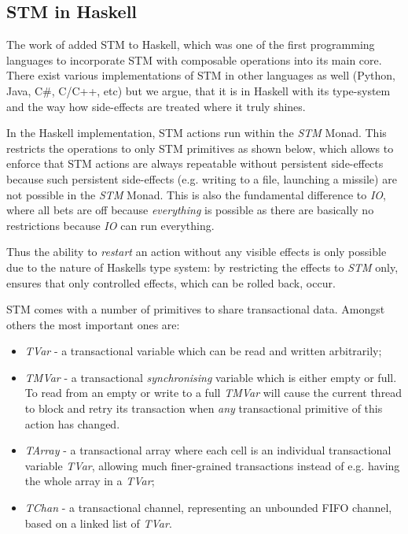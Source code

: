 \subsection{STM in Haskell}
The work of \cite{harris_composable_2005, harris_transactional_2006} added STM to Haskell, which was one of the first programming languages to incorporate STM with composable operations into its main core. There exist various implementations of STM in other languages as well (Python, Java, C\#, C/C++, etc) but we argue, that it is in Haskell with its type-system and the way how side-effects are treated where it truly shines.

In the Haskell implementation, STM actions run within the \textit{STM} Monad. This restricts the operations to only STM primitives as shown below, which allows to enforce that STM actions are always repeatable without persistent side-effects because such persistent side-effects (e.g. writing to a file, launching a missile) are not possible in the \textit{STM} Monad. This is also the fundamental difference to  \textit{IO}, where all bets are off because \textit{everything} is possible as there are basically no restrictions because \textit{IO} can run everything.

Thus the ability to \textit{restart} an action without any visible effects is only possible due to the nature of Haskells type system: by restricting the effects to \textit{STM} only, ensures that only controlled effects, which can be rolled back, occur.

STM comes with a number of primitives to share transactional data. Amongst others the most important ones are:

\begin{itemize}
	\item \textit{TVar} - a transactional variable which can be read and written arbitrarily;
	\item \textit{TMVar} - a transactional \textit{synchronising} variable which is either empty or full. To read from an empty or write to a full \textit{TMVar} will cause the current thread to block and retry its transaction when \textit{any} transactional primitive of this action has changed.
	\item \textit{TArray} - a transactional array where each cell is an individual transactional variable \textit{TVar}, allowing much finer-grained transactions instead of e.g. having the whole array in a \textit{TVar};
	\item \textit{TChan} - a transactional channel, representing an unbounded FIFO channel, based on a linked list of \textit{TVar}.
\end{itemize}

